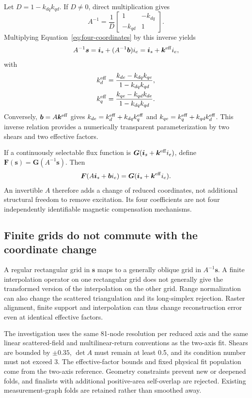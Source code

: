 Let $D=1-k_{dq}k_{qd}$. If $D\ne0$, direct multiplication gives
\begin{equation}
A^{-1}=\frac1D
\begin{bmatrix}1&-k_{dq}\\-k_{qd}&1\end{bmatrix}.
\end{equation}
Multiplying Equation~\eqref{eq:four-coordinates} by this inverse yields
\begin{equation}
A^{-1}\bm s=\bm i_s+(A^{-1}\bm b)i_e
=\bm i_s+\bm k^{\rm eff}i_e,
\end{equation}
with
\begin{align}
k_d^{\rm eff}&=\frac{k_{de}-k_{dq}k_{qe}}{1-k_{dq}k_{qd}},\\
k_q^{\rm eff}&=\frac{k_{qe}-k_{qd}k_{de}}{1-k_{dq}k_{qd}}.
\label{eq:effective-factors}
\end{align}
Conversely, $\bm b=A\bm k^{\rm eff}$ gives
$k_{de}=k_d^{\rm eff}+k_{dq}k_q^{\rm eff}$ and
$k_{qe}=k_q^{\rm eff}+k_{qd}k_d^{\rm eff}$.
This inverse relation provides a numerically transparent parameterization by two shears and two effective factors.

If a continuously selectable flux function is $\bm G(\bm i_s+\bm k^{\rm eff}i_e)$, define $\bm F(\bm s)=\bm G(A^{-1}\bm s)$. Then
\begin{equation}
\bm F(A\bm i_s+\bm b i_e)
=\bm G(\bm i_s+\bm k^{\rm eff}i_e).
\end{equation}
An invertible $A$ therefore adds a change of reduced coordinates, not additional structural freedom to remove excitation. Its four coefficients are not four independently identifiable magnetic compensation mechanisms.

\subsection{Finite grids do not commute with the coordinate change}
A regular rectangular grid in $\bm s$ maps to a generally oblique grid in $A^{-1}\bm s$. A finite interpolation operator on one rectangular grid does not generally give the transformed version of the interpolation on the other grid. Range normalization can also change the scattered triangulation and its long-simplex rejection. Raster alignment, finite support and interpolation can thus change reconstruction error even at identical effective factors.

The investigation uses the same 81-node resolution per reduced axis and the same linear scattered-field and multilinear-return conventions as the two-axis fit. Shears are bounded by $\pm0.35$, $\det A$ must remain at least 0.5, and its condition number must not exceed 3. The effective-factor bounds and fixed physical fit population come from the two-axis reference. Geometry constraints prevent new or deepened folds, and finalists with additional positive-area self-overlap are rejected. Existing measurement-graph folds are retained rather than smoothed away.

